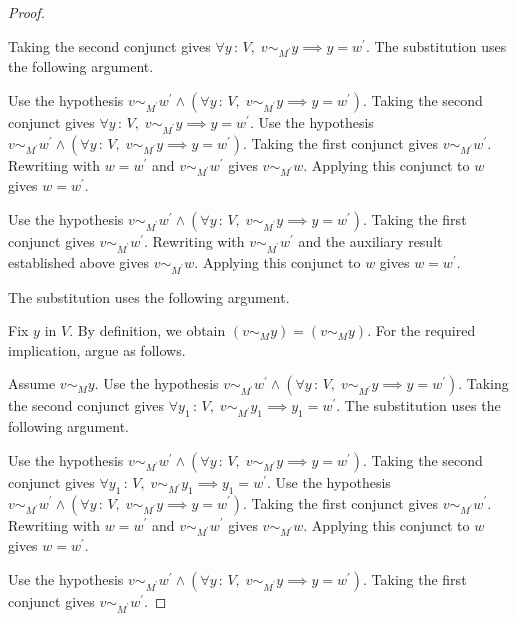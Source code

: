 \documentclass{article}
\theoremstyle{paperresult}
\newenvironment{proofstep}{\par\smallskip\ifdim\leftskip<3em\relax\advance\leftskip by 1em\relax\fi\noindent\ignorespaces}{\par\smallskip}
\begin{document}
\begin{proof}
\begin{proofstep}
\begin{proofstep}
\begin{proofstep}
\begin{proofstep}
\begin{proofstep}
\begin{proofstep}
\begin{proofstep}
Taking the second conjunct gives \(\forall y\, :\, V,\; v \sim_{M^{'}} y \implies y = w^{'}\).
The substitution uses the following argument.
\begin{proofstep}
Use the hypothesis \(v \sim_{M^{'}} w^{'} \land \left(\forall y\, :\, V,\; v \sim_{M^{'}} y \implies y = w^{'}\right)\).
Taking the second conjunct gives \(\forall y\, :\, V,\; v \sim_{M^{'}} y \implies y = w^{'}\).
Use the hypothesis \(v \sim_{M^{'}} w^{'} \land \left(\forall y\, :\, V,\; v \sim_{M^{'}} y \implies y = w^{'}\right)\).
Taking the first conjunct gives \(v \sim_{M^{'}} w^{'}\).
Rewriting with \(w = w^{'}\) and \(v \sim_{M^{'}} w^{'}\) gives \(v \sim_{M^{'}} w\).
Applying this conjunct to \(w\) gives \(w = w^{'}\).
\end{proofstep}
Use the hypothesis \(v \sim_{M^{'}} w^{'} \land \left(\forall y\, :\, V,\; v \sim_{M^{'}} y \implies y = w^{'}\right)\).
Taking the first conjunct gives \(v \sim_{M^{'}} w^{'}\).
Rewriting with \(v \sim_{M^{'}} w^{'}\) and the auxiliary result established above gives \(v \sim_{M^{'}} w\).
Applying this conjunct to \(w\) gives \(w = w^{'}\).
\end{proofstep}
The substitution uses the following argument.
\begin{proofstep}
Fix \(y\) in \(V\).
By definition, we obtain \(\left(v \sim_{M} y\right) = \left(v \sim_{M} y\right)\).
For the required implication, argue as follows.
\begin{proofstep}
Assume \(v \sim_{M} y\).
Use the hypothesis \(v \sim_{M^{'}} w^{'} \land \left(\forall y\, :\, V,\; v \sim_{M^{'}} y \implies y = w^{'}\right)\).
Taking the second conjunct gives \(\forall y_{1}\, :\, V,\; v \sim_{M^{'}} y_{1} \implies y_{1} = w^{'}\).
The substitution uses the following argument.
\begin{proofstep}
Use the hypothesis \(v \sim_{M^{'}} w^{'} \land \left(\forall y\, :\, V,\; v \sim_{M^{'}} y \implies y = w^{'}\right)\).
Taking the second conjunct gives \(\forall y_{1}\, :\, V,\; v \sim_{M^{'}} y_{1} \implies y_{1} = w^{'}\).
Use the hypothesis \(v \sim_{M^{'}} w^{'} \land \left(\forall y\, :\, V,\; v \sim_{M^{'}} y \implies y = w^{'}\right)\).
Taking the first conjunct gives \(v \sim_{M^{'}} w^{'}\).
Rewriting with \(w = w^{'}\) and \(v \sim_{M^{'}} w^{'}\) gives \(v \sim_{M^{'}} w\).
Applying this conjunct to \(w\) gives \(w = w^{'}\).
\end{proofstep}
Use the hypothesis \(v \sim_{M^{'}} w^{'} \land \left(\forall y\, :\, V,\; v \sim_{M^{'}} y \implies y = w^{'}\right)\).
Taking the first conjunct gives \(v \sim_{M^{'}} w^{'}\).

\end{proofstep}
\end{proofstep}
\end{proofstep}
\end{proofstep}
\end{proofstep}
\end{proofstep}
\end{proofstep}
\end{proofstep}
\end{proof}
\end{document}
